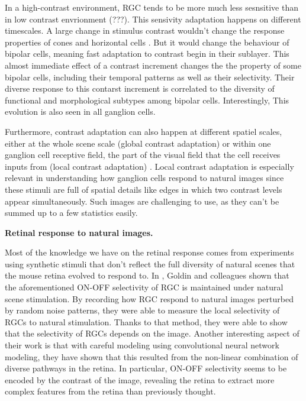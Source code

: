 In a high-contrast environment, RGC tends to be more much less sesnsitive than
in low contrast envrionment \cite{} (???).
This sensivity adaptation happens on different timescales.
A large change in stimulus contrast wouldn't change the response properties of
cones and horizontal cells \citep{baccus_fast_2002}. But it would change the
behaviour of
bipolar cells, meaning fast adaptation to contrast begin in their sublayer.
This almost immediate effect of a contrast increment changes the the property
of some bipolar cells, including their temporal patterns as well as their
selectivity. Their diverse response to this contarst increment
is correlated to the diversity of functional and morphological subtypes among
bipolar cells.
Interestingly, This evolution is also seen in all ganglion cells.



Furthermore, contrast adaptation can also
happen at different spatiel scales, either at the whole scene scale (global
contrast
adaptation) or within one ganglion cell receptive field, the part of the visual
field that the cell receives inputs from (local contrast adaptation)
\citep{garvert_local_2013}. Local contrast adaptation is especially relevant in
understanding how ganglion cells respond to natural images since these stimuli
are full of spatial details like edges in which two contrast levels appear
simultaneously. Such images are challenging to use, as they can't be summed up
to a few statistics easily.


\textbf{Retinal response to natural images.}

Most of the knowledge we have on the retinal response comes from experiments
using synthetic stimuli that don't reflect the full diversity of natural
scenes that the mouse retina evolved to respond to. In
\cite{goldin_context-dependent_2022}, Goldin and colleagues shown that the
aforementioned ON-OFF selectivity of RGC is maintained under natural scene
stimulation. By recording how RGC respond to natural images perturbed by
random noise patterns, they were able to measure the local selectivity of RGCs
to natural stimulation.
Thanks to that method, they were able to show that the selectivity of RGCs
depends on the image. Another interesting aspect of their work is that with
careful modeling using convolutional neural network modeling, they have shown
that this resulted from the non-linear combination of diverse pathways in the
retina. In particular, ON-OFF selectivity seems to be encoded by the contrast
of the image, revealing the retina to extract more complex features from the
retina than previously thought.

